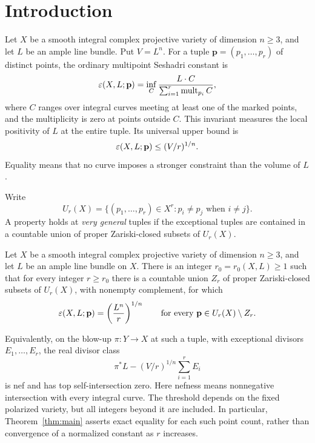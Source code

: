 \section{Introduction}\label{sec:introduction}

Let $X$ be a smooth integral complex projective variety of dimension $n\ge3$,
and let $L$ be an ample line bundle. Put $V=L^n$. For a tuple
$\mathbf p=(p_1,\ldots,p_r)$ of distinct points, the ordinary multipoint
Seshadri constant is
\begin{equation}\label{eq:seshadri-definition}
 \varepsilon(X,L;\mathbf p)
 =\inf_C\frac{L\cdot C}{\sum_{i=1}^r\operatorname{mult}_{p_i}C},
\end{equation}
where $C$ ranges over integral curves meeting at least one of the marked
points, and the multiplicity is zero at points outside $C$. This invariant
measures the local positivity of $L$ at the entire tuple. Its universal
upper bound is
\begin{equation}\label{eq:volume-bound}
 \varepsilon(X,L;\mathbf p)\le (V/r)^{1/n}.
\end{equation}
Equality means that no curve imposes a stronger constraint than the volume
of $L$.

Write
\[
 U_r(X)=\{(p_1,\ldots,p_r)\in X^r:p_i\ne p_j\text{ when }i\ne j\}.
\]
A property holds at \emph{very general} tuples if the exceptional tuples
are contained in a countable union of proper Zariski-closed subsets of
$U_r(X)$.

\begin{theorem}\label{thm:main}
Let $X$ be a smooth integral complex projective variety of dimension
$n\ge3$, and let $L$ be an ample line bundle on $X$. There is an integer
$r_0=r_0(X,L)\ge1$ such that for every integer $r\ge r_0$ there is a
countable union $Z_r$ of proper Zariski-closed subsets of $U_r(X)$, with
nonempty complement, for which
\[
 \varepsilon(X,L;\mathbf p)=\left(\frac{L^n}{r}\right)^{1/n}
 \qquad\text{for every }\mathbf p\in U_r(X)\setminus Z_r.
\]
\end{theorem}

\begin{samepage}
Equivalently, on the blow-up $\pi:Y\to X$ at such a tuple, with exceptional
divisors $E_1,\ldots,E_r$, the real divisor class
\[
 \pi^*L-(V/r)^{1/n}\sum_{i=1}^rE_i
\]
is nef and has top self-intersection zero. Here nefness means nonnegative
intersection with every integral curve. The threshold depends on the fixed
polarized variety, but all integers beyond it are included. In particular,
Theorem~\ref{thm:main} asserts exact equality for each such point count,
rather than convergence of a normalized constant as $r$ increases.
\end{samepage}

